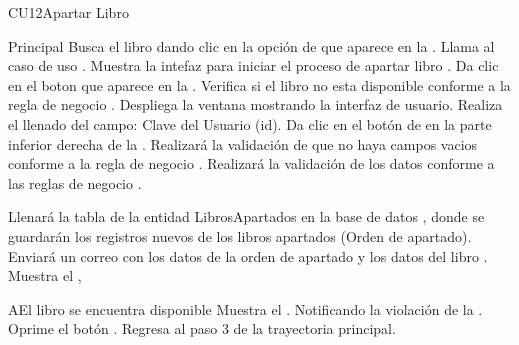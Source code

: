 \begin{UseCase}{CU12}{Apartar Libro}
	\end{UseCase}
	\begin{UCtrayectoria}{Principal}
		\UCpaso[\UCactor] Busca el libro dando clic en la opción de  que aparece en la .
		\UCpaso[\UCsist] Llama al caso de uso .
		\UCpaso[\UCsist] Muestra la intefaz para iniciar el proceso de apartar libro .
		\UCpaso[\UCactor] Da clic en el boton  que aparece en la .
		\UCpaso[\UCsist] Verifica si el libro no esta disponible conforme a la regla de negocio .
		\UCpaso[\UCsist] Despliega la ventana  mostrando la interfaz de usuario.
		\UCpaso[\UCactor] Realiza el llenado del campo: Clave del Usuario (id).
		\UCpaso[\UCactor] Da clic en el botón de  en la parte inferior derecha de la .
		\UCpaso[\UCsist] Realizará la validación de que no haya campos vacios conforme a la regla de negocio .		
		\UCpaso[\UCsist] Realizará la validación de los datos conforme a las reglas de negocio  .
		
		\UCpaso[\UCsist] Llenará la tabla de la entidad LibrosApartados en la base de datos , donde se guardarán los registros nuevos de los libros apartados (Orden de apartado). 
		\UCpaso[\UCsist] Enviará un correo con los datos de la orden de apartado y los datos del libro .		
		\UCpaso[\UCsist] Muestra el ,
	\end{UCtrayectoria}
		\begin{UCtrayectoriaA}{A}{El libro se encuentra disponible}
			\UCpaso[\UCsist] Muestra el . Notificando la violación de la .
			\UCpaso[\UCactor] Oprime el botón .
			\UCpaso[\UCsist] Regresa al paso 3 de la trayectoria principal.
		\end{UCtrayectoriaA}		
		

